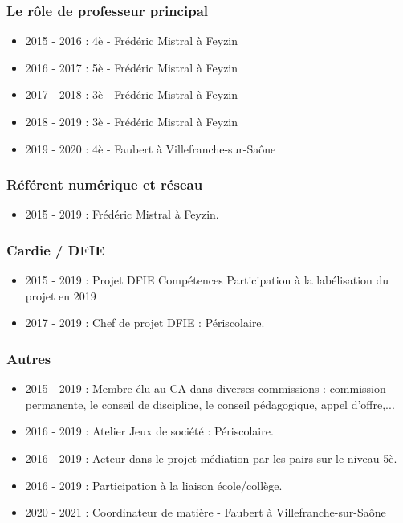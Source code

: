 \documentclass[11pt]{article}
\begin{document}
\subsubsection{Le rôle de professeur principal}

\begin{itemize}
  \item 2015 - 2016 : 4è - Frédéric Mistral à Feyzin
  \item 2016 - 2017 : 5è - Frédéric Mistral à Feyzin
  \item 2017 - 2018 : 3è - Frédéric Mistral à Feyzin
  \item 2018 - 2019 : 3è - Frédéric Mistral à Feyzin
  \item 2019 - 2020 : 4è - Faubert à Villefranche-sur-Saône
\end{itemize}

\subsubsection{Référent numérique et réseau}

\begin{itemize}
  \item 2015 - 2019 : Frédéric Mistral à Feyzin.
\end{itemize}

\subsubsection{Cardie / DFIE}

\begin{itemize}
  \item 2015 - 2019 : Projet DFIE Compétences
    Participation à la labélisation du projet en 2019
  \item 2017 - 2019 : Chef de projet DFIE : Périscolaire.
\end{itemize}

\subsubsection{Autres}

\begin{itemize}
  \item 2015 - 2019 : Membre élu au CA dans diverses commissions : commission permanente, le conseil de discipline, le conseil pédagogique, appel d'offre,...
  \item 2016 - 2019 : Atelier Jeux de société : Périscolaire.
  \item 2016 - 2019 : Acteur dans le projet médiation par les pairs sur le niveau 5è.
  \item 2016 - 2019 : Participation à la liaison école/collège.
  \item 2020 - 2021 : Coordinateur de matière - Faubert à Villefranche-sur-Saône
\end{itemize}
\end{document}
